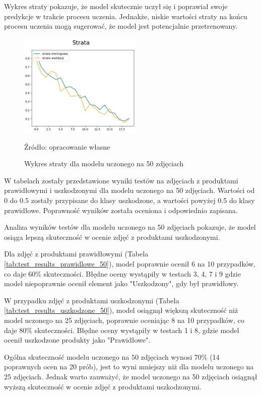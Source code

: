 Wykres straty pokazuje, że model skutecznie uczył się i poprawiał swoje predykcje w trakcie procesu uczenia. Jednakże, niskie wartości straty na końcu procesu uczenia mogą sugerować, że model jest potencjalnie przetrenowany.

\begin{figure}[htbp]
  \centering
  \caption{Wykres straty dla modelu uczonego na 50 zdjęciach}
  \includegraphics[width=220px]{images/strata_50.png}
  \begin{center}
  \footnotesize{Źródło: opracowanie własne}
  \end{center}
  \label{fig:wykres_strata_50}
\end{figure}

W tabelach zostały przedstawione wyniki testów na zdjęciach z produktami prawidłowymi i uszkodzonymi dla modelu uczonego na 50 zdjęciach. Wartości od 0 do 0.5 zostały przypisane do klasy uszkodzone, a wartości powyżej 0.5 do klasy prawidłowe. Poprawność wyników została oceniona i odpowiednio zapisana.

Analiza wyników testów dla modelu uczonego na 50 zdjęciach pokazuje, że model osiąga lepszą skuteczność w ocenie zdjęć z produktami uszkodzonymi.

Dla zdjęć z produktami prawidłowymi (Tabela \ref{tab:test_results_prawidlowe_50}), model poprawnie ocenił 6 na 10 przypadków, co daje 60\% skuteczności. Błędne oceny wystąpiły w testach 3, 4, 7 i 9 gdzie model niepoprawnie ocenił element jako "Uszkodzony", gdy był prawidłowy.

W przypadku zdjęć z produktami uszkodzonymi (Tabela \ref{tab:test_results_uszkodzone_50}), model osiągnął większą skuteczność niż model uczonego na 25 zdjęciach, poprawnie oceniając 8 na 10 przypadków, co daje 80\% skuteczności. Błędne oceny wystąpiły w testach 1 i 8, gdzie model ocenił uszkodzone produkty jako "Prawidłowe".

Ogólna skuteczność modelu uczonego na 50 zdjęciach wynosi 70\% (14 poprawnych ocen na 20 prób), jest to wyni mniejszy niż dla modelu uczonego na 25 zdjęciach. Jednak warto zauważyć, że model uczonego na 50 zdjęciach osiągnął wyższą skuteczność w ocenie zdjęć z produktami uszkodzonymi.

